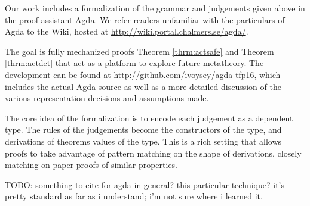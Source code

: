 Our work includes a formalization of the grammar and judgements given above
in the proof assistant Agda. We refer readers unfamiliar with the
particulars of Agda to the Wiki, hosted
at \url{http://wiki.portal.chalmers.se/agda/}.

The goal is fully mechanized proofs Theorem \ref{thrm:actsafe} and
Theorem \ref{thrm:actdet} that act as a platform to explore future
metatheory. The development can be found at
\url{http://github.com/ivoysey/agda-tfp16}, which includes the actual Agda
source as well as a more detailed discussion of the various representation
decisions and assumptions made.

The core idea of the formalization is to encode each judgement as a
dependent type. The rules of the judgements become the constructors of the
type, and derivations of theorems values of the type. This is a rich
setting that allows proofs to take advantage of pattern matching on the
shape of derivations, closely matching on-paper proofs of similar
properties.

TODO: something to cite for agda in general? this particular technique?
it's pretty standard as far as i understand; i'm not sure where i learned
it.


